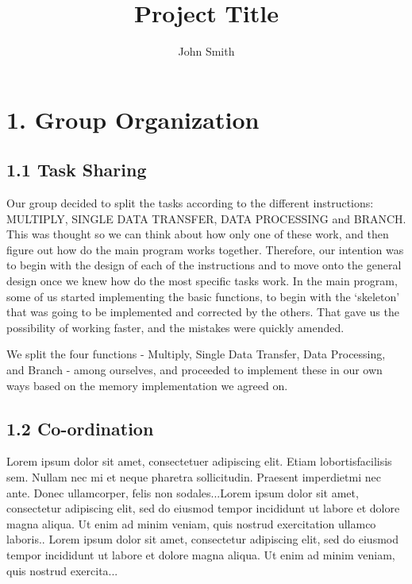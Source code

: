 \documentclass[a4paper, twoside]{report}
\title{Project Title}
\author{John Smith}
\begin{document}



\section*{1. Group Organization}

\subsection*{1.1 Task Sharing}
Our group decided to split the tasks according to the different instructions: MULTIPLY, SINGLE DATA TRANSFER, DATA PROCESSING and BRANCH. This was thought so we can think about how only one of these work, and then figure out how do the main program works together.
Therefore, our intention was to begin with the design of each of the instructions and to move onto the general design once we knew how do the most specific tasks work.
In the main program, some of us started implementing the basic functions, to begin with the ‘skeleton’ that was going to be implemented and corrected by the others. That gave us the possibility of working faster, and the mistakes were quickly amended.


We split the four functions - Multiply, Single Data Transfer, Data Processing, and Branch - among ourselves, and proceeded to implement these in our own ways based on the memory implementation we agreed on. 

\subsection*{1.2 Co-ordination}
Lorem  ipsum  dolor  sit  amet,  consectetuer  adipiscing  
elit.   Etiam  lobortisfacilisis sem.  Nullam nec mi et 
neque pharetra sollicitudin.  Praesent imperdietmi nec ante. 
Donec ullamcorper, felis non sodales...Lorem ipsum dolor sit amet, consectetur adipiscing elit, sed do 
eiusmod tempor incididunt ut labore et dolore magna aliqua. Ut 
enim ad minim veniam, quis nostrud exercitation ullamco laboris..
 Lorem ipsum dolor sit amet, consectetur adipiscing elit, sed do 
eiusmod tempor incididunt ut labore et dolore magna aliqua. Ut 
enim ad minim veniam, quis nostrud exercita...

\section*{}
\end{document}
